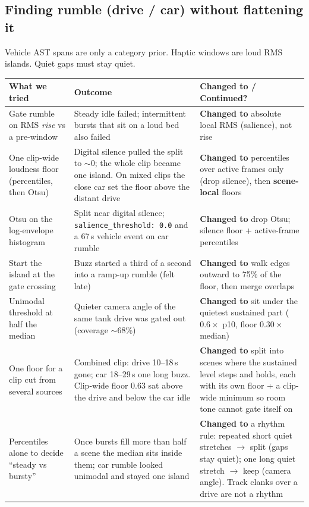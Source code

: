 \documentclass[11pt,a4paper]{article}
\begin{document}
\subsection*{Finding rumble (drive / car) without flattening it}
Vehicle AST spans are only a category prior. Haptic windows are loud RMS islands. Quiet gaps must stay quiet.

\begin{center}
\small
\begin{tabularx}{\textwidth}{@{}>{\raggedright\arraybackslash}p{4cm}>{\raggedright\arraybackslash}p{4cm}>{\raggedright\arraybackslash}X@{}}
\toprule
\textbf{What we tried} & \textbf{Outcome} & \textbf{Changed to / Continued?} \\
\midrule
Gate rumble on RMS \emph{rise} vs a pre-window & Steady idle failed; intermittent bursts that sit on a loud bed also failed & \textbf{Changed to} absolute local RMS (salience), not rise \\
\addlinespace
One clip-wide loudness floor (percentiles, then Otsu) & Digital silence pulled the split to $\sim$0; the whole clip became one island. On mixed clips the close car set the floor above the distant drive & \textbf{Changed to} percentiles over active frames only (drop silence), then \textbf{scene-local} floors \\
\addlinespace
Otsu on the log-envelope histogram & Split near digital silence; \texttt{salience\_threshold: 0.0} and a 67\,s vehicle event on car rumble & \textbf{Changed to} drop Otsu; silence floor + active-frame percentiles \\
\addlinespace
Start the island at the gate crossing & Buzz started a third of a second into a ramp-up rumble (felt late) & \textbf{Changed to} walk edges outward to 75\% of the floor, then merge overlaps \\
\addlinespace
Unimodal threshold at half the median & Quieter camera angle of the same tank drive was gated out (coverage $\sim$68\%) & \textbf{Changed to} sit under the quietest sustained part ($0.6\times$ p10, floor $0.30\times$ median) \\
\addlinespace
One floor for a clip cut from several sources & Combined clip: drive 10--18\,s gone; car 18--29\,s one long buzz. Clip-wide floor 0.63 sat above the drive and below the car idle & \textbf{Changed to} split into scenes where the sustained level steps and holds, each with its own floor + a clip-wide minimum so room tone cannot gate itself on \\
\addlinespace
Percentiles alone to decide ``steady vs bursty'' & Once bursts fill more than half a scene the median sits inside them; car rumble looked unimodal and stayed one island & \textbf{Changed to} a rhythm rule: repeated short quiet stretches $\to$ split (gaps stay quiet); one long quiet stretch $\to$ keep (camera angle). Track clanks over a drive are not a rhythm \\

\end{tabularx}
\end{center}
\end{document}

